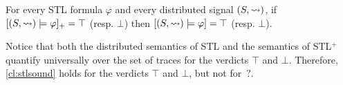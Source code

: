 \begin{theorem} \label{cl:stlsound}
	For every STL formula $\varphi$ and every distributed signal $(S,{\rightsquigarrow})$, if $[(S,{\rightsquigarrow}) \models \varphi]_+ = \top$ (resp. $\bot$) then $[(S,{\rightsquigarrow}) \models \varphi] = \top$ (resp. $\bot$).
\end{theorem}

Notice that both the distributed semantics of STL and the semantics of STL$^+$ quantify universally over the set of traces for the verdicts $\top$ and $\bot$.
Therefore, \cref{cl:stlsound} holds for the verdicts $\top$ and $\bot$, but not for ${\,?}$.

